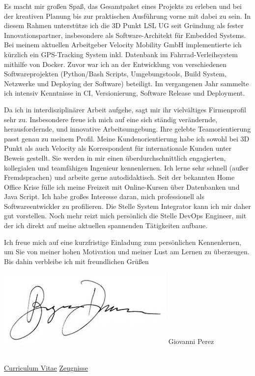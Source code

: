 \documentclass[a4paper,10pt]{article}
\begin{document}
Es macht mir großen Spaß, das Gesamtpaket eines Projekts zu erleben und bei der kreativen Planung bis zur praktischen Ausführung vorne mit dabei zu sein. In diesem Rahmen unterstütze ich die 3D Punkt LSL UG seit Gründung als fester Innovationspartner, insbesondere als Software-Architekt für Embedded Systems. Bei meinem aktuellen Arbeitgeber Velocity Mobility GmbH implementierte ich kürzlich ein GPS-Tracking System inkl. Datenbank im Fahrrad-Verleihsystem mithilfe von Docker. Zuvor war ich an der Entwicklung von verschiedenen Softwareprojekten (Python/Bash Scripts, Umgebungstools, Build System, Netzwerke und Deploying der Software) beteiligt. Im vergangenen Jahr sammelte ich intensiv Kenntnisse in CI, Versionierung, Software Release und Deployment.  \vfill

Da ich in interdisziplinärer Arbeit aufgehe, sagt mir ihr vielvältiges Firmenprofil sehr zu. Insbesondere freue ich mich auf eine sich ständig verändernde, herausfordernde, und innovative Arbeitsumgebung. Ihre gelebte Teamorientierung passt genau zu meinem Profil. Meine Kundenorientierung habe ich sowohl bei 3D Punkt als auch Velocity als Korrespondent für internationale Kunden unter Beweis gestellt.\vfill
Sie werden in mir einen überdurchschnittlich engagierten, kollegialen und teamfähigen Ingenieur kennenlernen. Ich lerne sehr schnell (außer Fremdsprachen) und arbeite gerne autodidaktisch. Seit der bekannten Home Office Krise fülle ich meine Freizeit mit Online-Kursen über Datenbanken und Java Script. Ich habe großes Interesse daran, mich professionell als Softwareentwickler zu profilieren. Die Stelle System Integrator kann ich mir daher gut vorstellen. Noch mehr reizt mich persönlich die Stelle DevOps Engineer, mit der ich direkt auf meine aktuellen spannenden Tätigkeiten aufbaue. \vfill

Ich freue mich auf eine kurzfristige Einladung zum persönlichen Kennenlernen, um Sie von meiner
hohen Motivation und meiner Lust am Lernen zu überzeugen. Bis dahin verbleibe ich\vfill
mit freundlichen Grüßen



\begin{minipage}[c][3cm][b]{4cm}
        \includegraphics[width=0.7\linewidth]{pics/images.jpeg}
        \centering Giovanni Perez
\end{minipage}
\hfill
\begin{minipage}[c][3cm][b]{4cm}
\\ \hspace{0.5cm}
\href{page.3}{Curriculum Vitae}
\href{https://www.dropbox.com/s/eupscb6bi17vcpj/Perez_Zeugnisse.pdf?dl=0}{Zeugnisse}
\end{minipage}



\pagebreak
\end{document}
